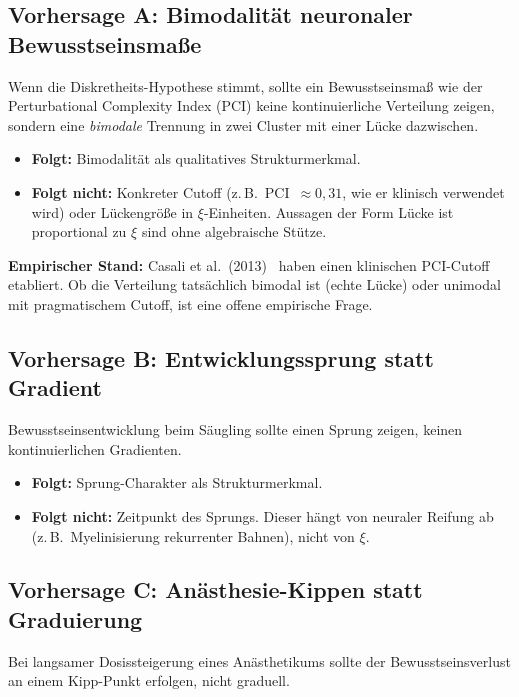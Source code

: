 \subsection{Vorhersage A: Bimodalität neuronaler Bewusstseinsmaße}\label{sec:vorhersageA}

Wenn die Diskretheits-Hypothese stimmt, sollte ein Bewusstseinsmaß wie der Perturbational Complexity Index (PCI) keine kontinuierliche Verteilung zeigen, sondern eine \emph{bimodale} Trennung in zwei Cluster mit einer Lücke dazwischen.

\begin{itemize}
\item \textbf{Folgt:} Bimodalität als qualitatives Strukturmerkmal.
\item \textbf{Folgt nicht:} Konkreter Cutoff (z.\,B.\ PCI~$\approx 0{,}31$, wie er klinisch verwendet wird) oder Lückengröße in $\xi$-Einheiten. Aussagen der Form \glqq Lücke ist proportional zu $\xi$\grqq{} sind ohne algebraische Stütze.
\end{itemize}

\textbf{Empirischer Stand:} Casali et al.~(2013)~\cite{Casali2013} haben einen klinischen PCI-Cutoff etabliert. Ob die Verteilung tatsächlich bimodal ist (echte Lücke) oder unimodal mit pragmatischem Cutoff, ist eine offene empirische Frage.

\subsection{Vorhersage B: Entwicklungssprung statt Gradient}\label{sec:vorhersageB}

Bewusstseinsentwicklung beim Säugling sollte einen Sprung zeigen, keinen kontinuierlichen Gradienten.

\begin{itemize}
\item \textbf{Folgt:} Sprung-Charakter als Strukturmerkmal.
\item \textbf{Folgt nicht:} Zeitpunkt des Sprungs. Dieser hängt von neuraler Reifung ab (z.\,B.\ Myelinisierung rekurrenter Bahnen), nicht von $\xi$.
\end{itemize}

\subsection{Vorhersage C: Anästhesie-Kippen statt Graduierung}\label{sec:vorhersageC}

Bei langsamer Dosissteigerung eines Anästhetikums sollte der Bewusstseinsverlust an einem Kipp-Punkt erfolgen, nicht graduell.


